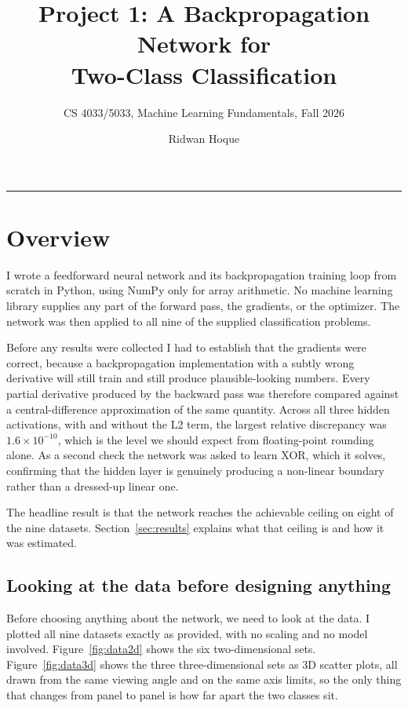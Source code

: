 \documentclass[11pt]{article}
\title{\vspace{-1.2cm}\textbf{Project 1: A Backpropagation Network for\\Two-Class Classification}}
\author{CS 4033/5033, Machine Learning Fundamentals, Fall 2026}
\date{Ridwan Hoque}
\begin{document}
\maketitle
\vspace{-0.6cm}
\noindent\rule{\textwidth}{0.4pt}

\section{Overview}

I wrote a feedforward neural network and its backpropagation training loop from
scratch in Python, using NumPy only for array arithmetic. No machine learning
library supplies any part of the forward pass, the gradients, or the optimizer.
The network was then applied to all nine of the supplied classification
problems.

Before any results were collected I had to establish that the gradients were
correct, because a backpropagation implementation with a subtly wrong
derivative will still train and still produce plausible-looking numbers. Every
partial derivative produced by the backward pass was therefore compared against
a central-difference approximation of the same quantity. Across all three
hidden activations, with and without the L2 term, the largest relative
discrepancy was $1.6 \times 10^{-10}$, which is the level we should expect from
floating-point rounding alone. As a second check the network was asked to learn
XOR, which it solves, confirming that the hidden layer is genuinely producing a
non-linear boundary rather than a dressed-up linear one.

The headline result is that the network reaches the achievable ceiling on eight
of the nine datasets. Section~\ref{sec:results} explains what that ceiling is
and how it was estimated.

\subsection*{Looking at the data before designing anything}
\label{sec:explore}

Before choosing anything about the network, we need to look at the data. I
plotted all nine datasets exactly as provided, with no scaling and no model
involved. Figure~\ref{fig:data2d} shows the six two-dimensional sets.
Figure~\ref{fig:data3d} shows the three three-dimensional sets as 3D scatter
plots, all drawn from the same viewing angle and on the same axis limits, so the
only thing that changes from panel to panel is how far apart the two classes
sit.
\end{document}
